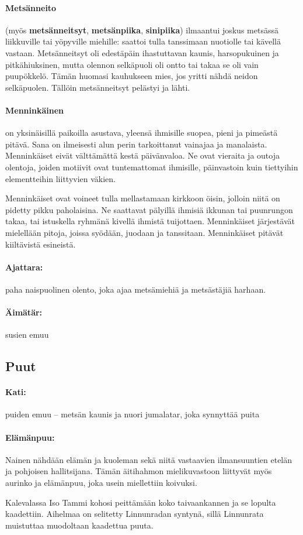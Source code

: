   \paragraph{Metsänneito} (myös \textbf{metsänneitsyt}, \textbf{metsänpiika}, \textbf{sinipiika}) 
    ilmaantui joskus metsässä liikkuville tai yöpyville miehille: saattoi tulla tanssimaan 
    nuotiolle tai kävellä vastaan. Metsänneitsyt oli edestäpäin ihastuttavan kaunis, 
    harsopukuinen ja pitkähiuksinen, mutta olennon selkäpuoli oli ontto tai takaa se oli vain 
    puupökkelö. Tämän huomasi kauhukseen mies, jos yritti nähdä neidon selkäpuolen. Tällöin 
    metsänneitsyt pelästyi ja lähti.
  \paragraph{Menninkäinen} on yksinäisillä paikoilla asustava, yleensä ihmisille suopea, pieni 
    ja pimeästä pitävä. Sana on ilmeisesti alun perin tarkoittanut vainajaa ja manalaista. Menninkäiset 
    eivät välttämättä kestä päivänvaloa. Ne ovat vieraita ja outoja olentoja, joiden motiivit ovat 
    tuntemattomat ihmisille, päinvastoin kuin tiettyihin elementteihin liittyvien väkien. \par
    Menninkäiset ovat voineet tulla mellastamaan kirkkoon öisin, jolloin niitä on pidetty 
    pikku paholaisina. Ne saattavat pälyillä ihmisiä ikkunan tai puunrungon takaa, tai 
    istuskella ryhmänä kivellä ihmistä tuijottaen. Menninkäiset järjestävät mielellään pitoja, 
    joissa syödään, juodaan ja tanssitaan. Menninkäiset pitävät kiiltävistä esineistä.
  \paragraph{Ajattara:} paha naispuolinen olento, joka ajaa metsämiehiä ja metsästäjiä 
    harhaan. 
  \paragraph{Äimätär:} susien emuu 


\subsection{Puut}

  \paragraph{Kati:} puiden emuu -- metsän kaunis ja nuori jumalatar, joka synnyttää puita 
  \paragraph{Elämänpuu:} Nainen nähdään elämän ja kuoleman sekä niitä vastaavien ilmansuuntien 
    etelän ja pohjoisen hallitsijana. Tämän äitihahmon mielikuvastoon liittyvät myös aurinko ja 
    elämänpuu, joka usein miellettiin koivuksi. \par Kalevalassa Iso Tammi kohosi peittämään koko 
    taivaankannen ja se lopulta kaadettiin. Aihelmaa on selitetty Linnunradan syntynä, sillä 
    Linnunrata muistuttaa muodoltaan kaadettua puuta.
